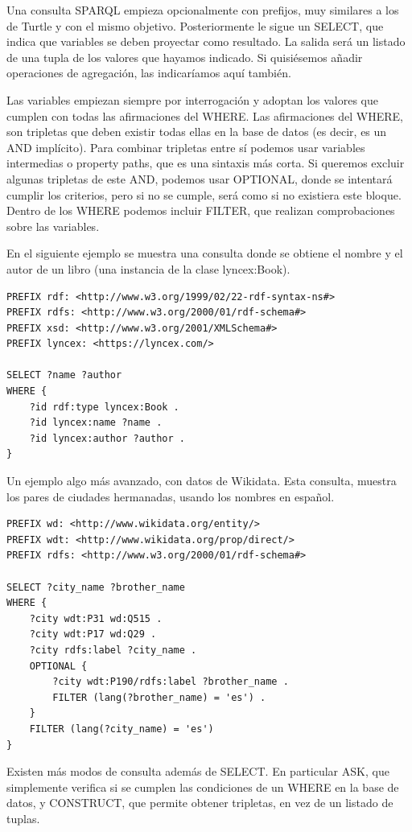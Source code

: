 \documentclass[openright,twoside,12pt]{book}
\begin{document}
Una consulta SPARQL empieza opcionalmente con prefijos, muy similares a los de Turtle y con el mismo objetivo. Posteriormente le sigue un SELECT, que indica que variables se deben proyectar como resultado. La salida será un listado de una tupla de los valores que hayamos indicado. Si quisiésemos añadir operaciones de agregación, las indicaríamos aquí también.

Las variables empiezan siempre por interrogación y adoptan los valores que cumplen con todas las afirmaciones del WHERE. Las afirmaciones del WHERE, son tripletas que deben existir todas ellas en la base de datos (es decir, es un AND implícito). Para combinar tripletas entre sí podemos usar variables intermedias o property paths, que es una sintaxis más corta. Si queremos excluir algunas tripletas de este AND, podemos usar OPTIONAL, donde se intentará cumplir los criterios, pero si no se cumple, será como si no existiera este bloque. Dentro de los WHERE podemos incluir FILTER, que realizan comprobaciones sobre las variables.

En el siguiente ejemplo se muestra una consulta donde se obtiene el nombre y el autor de un libro (una instancia de la clase lyncex:Book).

\begin{lstlisting}
PREFIX rdf: <http://www.w3.org/1999/02/22-rdf-syntax-ns#>
PREFIX rdfs: <http://www.w3.org/2000/01/rdf-schema#>
PREFIX xsd: <http://www.w3.org/2001/XMLSchema#>
PREFIX lyncex: <https://lyncex.com/>

SELECT ?name ?author
WHERE {
    ?id rdf:type lyncex:Book .
    ?id lyncex:name ?name .
    ?id lyncex:author ?author .
}
\end{lstlisting}

Un ejemplo algo más avanzado, con datos de Wikidata. Esta consulta, muestra los pares de ciudades hermanadas, usando los nombres en español.

\begin{lstlisting}
PREFIX wd: <http://www.wikidata.org/entity/>
PREFIX wdt: <http://www.wikidata.org/prop/direct/>
PREFIX rdfs: <http://www.w3.org/2000/01/rdf-schema#>

SELECT ?city_name ?brother_name
WHERE {
    ?city wdt:P31 wd:Q515 .
    ?city wdt:P17 wd:Q29 .
    ?city rdfs:label ?city_name .
    OPTIONAL {
        ?city wdt:P190/rdfs:label ?brother_name .
        FILTER (lang(?brother_name) = 'es') .
    }
    FILTER (lang(?city_name) = 'es')
}
\end{lstlisting}

Existen más modos de consulta además de SELECT. En particular ASK, que simplemente verifica si se cumplen las condiciones de un WHERE en la base de datos, y CONSTRUCT, que permite obtener tripletas, en vez de un listado de tuplas.
\end{document}
